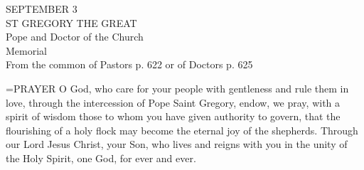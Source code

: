 \begin{center}\normalsize SEPTEMBER 3\\
\footnotesize ST GREGORY THE GREAT\\
\footnotesize Pope and Doctor of the Church\\
\footnotesize Memorial\\
\footnotesize From the common of Pastors p. 622 or of Doctors p. 625\\
\end{center}

\hangindent=\parindent \small{PRAYER 
O God, who care for your people with gentleness
and rule them in love,
through the intercession of Pope Saint Gregory,
endow, we pray, with a spirit of wisdom
those to whom you have given authority to govern,
that the flourishing of a holy flock
may become the eternal joy of the shepherds.
Through our Lord Jesus Christ, your Son,
who lives and reigns with you in the unity of the Holy Spirit,
one God, for ever and ever.\\}
 

